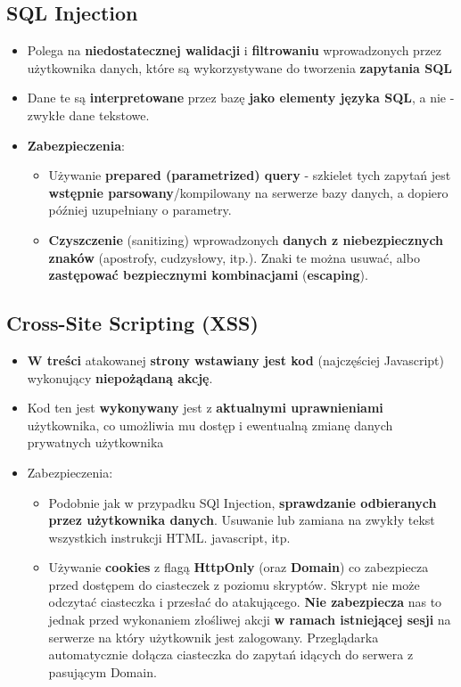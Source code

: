 \documentclass[../main.tex]{subfiles}
\begin{document}
    \subsection{SQL Injection}
    \begin{itemize}
        \item Polega na \textbf{niedostatecznej walidacji} i \textbf{filtrowaniu} wprowadzonych przez
        użytkownika danych, które są wykorzystywane do tworzenia \textbf{zapytania SQL}
        \item Dane te są \textbf{interpretowane} przez bazę \textbf{jako elementy języka SQL}, a nie -
        zwykłe dane tekstowe.
        \item \textbf{Zabezpieczenia}:
        \begin{itemize}
            \item Używanie \textbf{prepared (parametrized) query} - szkielet tych zapytań jest \textbf{wstępnie parsowany}/kompilowany na serwerze
            bazy danych, a dopiero później uzupełniany o parametry.
            \item \textbf{Czyszczenie} (sanitizing) wprowadzonych \textbf{danych z niebezpiecznych znaków}
            (apostrofy, cudzysłowy, itp.). Znaki te można usuwać, albo \textbf{zastępować bezpiecznymi kombinacjami} (\textbf{escaping}).
        \end{itemize}
    \end{itemize}

    \subsection{Cross-Site Scripting (XSS)}
    \begin{itemize}
        \item \textbf{W treści} atakowanej \textbf{strony wstawiany jest kod} (najczęściej Javascript)
        wykonujący \textbf{niepożądaną akcję}.
        \item Kod ten jest \textbf{wykonywany} jest z \textbf{aktualnymi uprawnieniami} użytkownika, co
        umożliwia mu dostęp i ewentualną zmianę danych prywatnych użytkownika
        \item Zabezpieczenia:
        \begin{itemize}
            \item Podobnie jak w przypadku SQl Injection, \textbf{sprawdzanie odbieranych przez
            użytkownika danych}. Usuwanie lub zamiana na zwykły tekst wszystkich
            instrukcji HTML. javascript, itp.
            \item Używanie \textbf{cookies} z flagą \textbf{HttpOnly} (oraz \textbf{Domain}) co zabezpiecza przed
            dostępem do ciasteczek z poziomu skryptów. Skrypt nie może odczytać
            ciasteczka i przesłać do atakującego.
            \textbf{Nie zabezpiecza} nas to jednak przed wykonaniem złośliwej akcji \textbf{w
            ramach istniejącej sesji} na serwerze na który użytkownik jest zalogowany.
            Przeglądarka automatycznie dołącza ciasteczka do zapytań idących do
            serwera z pasującym Domain.
        \end{itemize}
    \end{itemize}
\end{document}
